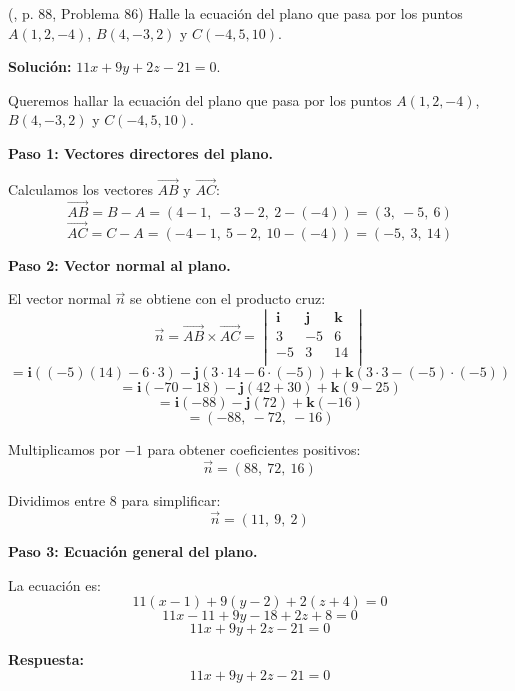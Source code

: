 \begin{prob} (\cite{espinoza2006Algebralineal}, p. 88, Problema 86) Halle la ecuación del plano que pasa por los puntos $A(1,2,-4)$, $B(4,-3,2)$ y $C(-4,5,10)$. 

\textbf{Solución:} $11x+9y+2z-21=0$.

\begin{myproof}
Queremos hallar la ecuación del plano que pasa por los puntos $A(1,2,-4)$, $B(4,-3,2)$ y $C(-4,5,10)$.

\textbf{Paso 1: Vectores directores del plano.}

Calculamos los vectores $\vec{AB}$ y $\vec{AC}$:
\[
\vec{AB} = B - A = (4-1,\ -3-2,\ 2-(-4)) = (3,\ -5,\ 6)
\]
\[
\vec{AC} = C - A = (-4-1,\ 5-2,\ 10-(-4)) = (-5,\ 3,\ 14)
\]

\textbf{Paso 2: Vector normal al plano.}

El vector normal $\vec{n}$ se obtiene con el producto cruz:
\[
\vec{n} = \vec{AB} \times \vec{AC}
= \begin{vmatrix}
\mathbf{i} & \mathbf{j} & \mathbf{k} \\
3 & -5 & 6 \\
-5 & 3 & 14 \\
\end{vmatrix}
\]
\[
= \mathbf{i}((-5)(14) - 6 \cdot 3) - \mathbf{j}(3 \cdot 14 - 6 \cdot (-5)) + \mathbf{k}(3 \cdot 3 - (-5) \cdot (-5))
\]
\[
= \mathbf{i}(-70 - 18) - \mathbf{j}(42 + 30) + \mathbf{k}(9 - 25)
\]
\[
= \mathbf{i}(-88) - \mathbf{j}(72) + \mathbf{k}(-16)
\]
\[
= (-88,\ -72,\ -16)
\]

Multiplicamos por $-1$ para obtener coeficientes positivos:
\[
\vec{n} = (88,\ 72,\ 16)
\]

Dividimos entre $8$ para simplificar:
\[
\vec{n} = (11,\ 9,\ 2)
\]

\textbf{Paso 3: Ecuación general del plano.}

La ecuación es:
\[
11(x - 1) + 9(y - 2) + 2(z + 4) = 0
\]
\[
11x - 11 + 9y - 18 + 2z + 8 = 0
\]
\[
11x + 9y + 2z - 21 = 0
\]

\textbf{Respuesta:}
\[
\boxed{11x + 9y + 2z - 21 = 0}
\]
\end{myproof}

\end{prob}

